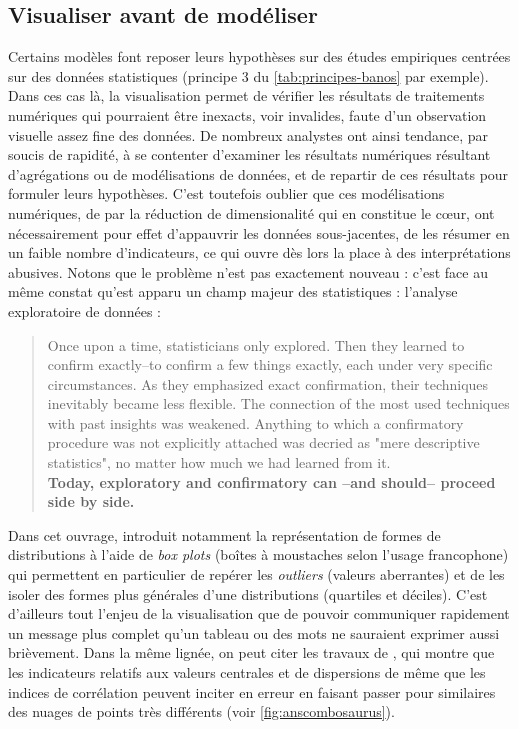 \documentclass[a4paper, 12pt]{article}
\begin{document}
\subsection{Visualiser avant de modéliser}

Certains modèles font reposer leurs hypothèses sur des études empiriques centrées sur des données statistiques (principe 3 du \cref{tab:principes-banos} par exemple).
Dans ces cas là, la visualisation permet de vérifier les résultats de traitements numériques qui pourraient être inexacts, voir invalides, faute d'un observation visuelle assez fine des données.
De nombreux analystes ont ainsi tendance, par soucis de rapidité, à se contenter d'examiner les résultats numériques résultant d'agrégations ou de modélisations de données, et de repartir de ces résultats pour formuler leurs hypothèses.
C'est toutefois oublier que ces modélisations numériques, de par la réduction de dimensionalité qui en constitue le cœur, ont nécessairement pour effet d'appauvrir les données sous-jacentes, de les résumer en un faible nombre d'indicateurs, ce qui ouvre dès lors la place à des interprétations abusives.
Notons que le problème n'est pas exactement nouveau : c'est face au même constat qu'est apparu un champ majeur des statistiques : l'analyse exploratoire de données :
\begin{quote}
	\og
	Once upon a time, statisticians only explored.
	Then they learned to confirm exactly--to confirm a few things exactly, each under very specific circumstances.
	As they emphasized exact confirmation, their techniques inevitably became less flexible.
	The connection of the most used techniques with past insights was weakened.
	Anything to which a confirmatory procedure was not explicitly attached was decried as "mere descriptive statistics", no matter how much we had learned from it.\textelp{}\\
	\textbf{Today, exploratory and confirmatory can --and should-- proceed side by side.}
	\fg{} \mbox{}~ \hspace{2.5cm} \cite[Préface, \ppno~vii]{tukey_exploratory_1977}
\end{quote}
\medskip
Dans cet ouvrage,  introduit notamment la représentation de formes de distributions à l'aide de \og \textit{box plots}\fg{} (\og boîtes à moustaches\fg{} selon l'usage francophone) qui permettent en particulier de repérer les \textit{outliers} (valeurs aberrantes) et de les isoler des formes plus générales d'une distributions (quartiles et déciles).
C'est d'ailleurs tout l'enjeu de la visualisation que de pouvoir communiquer rapidement un message plus complet qu'un tableau ou des mots ne sauraient exprimer aussi brièvement.
Dans la même lignée, on peut citer les travaux de \textcite{anscombe_graphs_1973}, qui montre que les indicateurs relatifs aux valeurs centrales et de dispersions de même que les indices de corrélation peuvent inciter en erreur en faisant passer pour similaires des nuages de points très différents (voir \cref{fig:anscombosaurus}).
\end{document}
